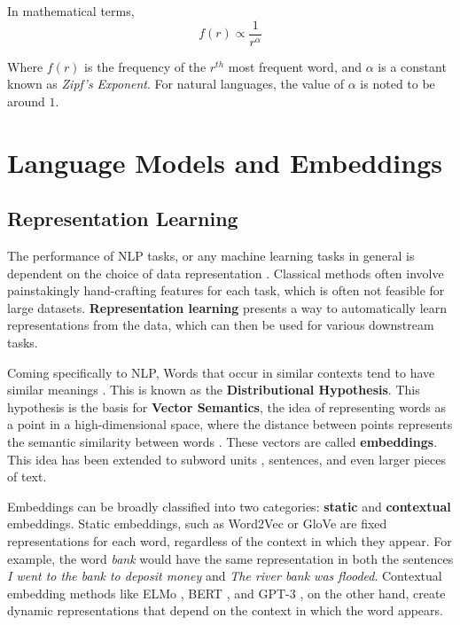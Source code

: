 In mathematical terms,
\begin{equation}
    f(r) \propto \frac{1}{r^\alpha}
\end{equation}

Where $f(r)$ is the frequency of the $r^{th}$ most frequent word, and $\alpha$ is a constant known as \textit{Zipf's Exponent}. For natural languages,
the value of $\alpha$ is noted to be around $1$.

\section{Language Models and Embeddings}

\subsection{Representation Learning}
The performance of NLP tasks, or any machine learning tasks in general is dependent on the choice of data representation \cite{bengioRepresentationLearningReview2014}.
Classical methods often involve painstakingly hand-crafting features for each task, which is often not feasible for large datasets. \textbf{Representation learning}
presents a way to automatically learn representations from the data, which can then be used for various downstream tasks. 

Coming specifically to NLP, Words that occur in similar contexts tend to have similar meanings \cite{harrisDistributionalStructure1954}. This is 
known as the \textbf{Distributional Hypothesis}. This hypothesis is the basis for \textbf{Vector Semantics}, the idea of representing words as a point
in a high-dimensional space, where the distance between points represents the semantic similarity between words \cite{jm3}. These vectors are called 
\textbf{embeddings}. This idea has been extended to subword units \cite{wuGooglesNeuralMachine2016}, sentences, and even larger pieces of text.

Embeddings can be broadly classified into two categories: \textbf{static} and \textbf{contextual} embeddings. Static embeddings, such as 
Word2Vec \cite{mikolovDistributedRepresentationsWords2013} or GloVe \cite{penningtonGloVeGlobalVectors2014} are fixed representations
for each word, regardless of the context in which they appear. For example, the word \textit{bank} would have the same representation in both the sentences
\textit{I went to the bank to deposit money} and \textit{The river bank was flooded}. Contextual embedding methods like ELMo \cite{petersDeepContextualizedWord2018}, BERT \cite{devlinBERTPretrainingDeep2019}, 
and GPT-3 \cite{brownLanguageModelsAre2020}, on the other hand, create dynamic representations that depend on the context in which the word appears.

